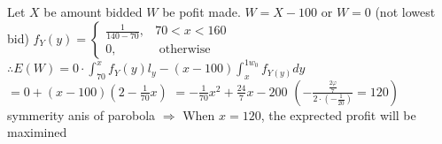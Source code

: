 Let $X$ be amount bidded $W$ be pofit made.
$W=X-100$ or $W=0$ (not lowest bid) $f_{Y}(y)=\left\{\begin{array}{ll}\frac{1}{140-70}, & 70<x<160 \\ 0, & \text { otherwise }\end{array}\right.$
$\therefore E(W)=0 \cdot \int_{70}^{x} f_{Y}(y) l_{y}-(x-100) \int_{x}^{1 w_{0}} f_{Y(y)} d y$
$=0+(x-100)\left(2-\frac{1}{70} x\right)$
$=-\frac{1}{70} x^{2}+\frac{24}{7} x-200$
$\left(-\frac{\frac{2 \varphi}{7}}{2 \cdot\left(-\frac{1}{20}\right)}=120\right)$
symmerity anis of parobola
$\Rightarrow$ When $x=120$, the exprected profit will be maximined